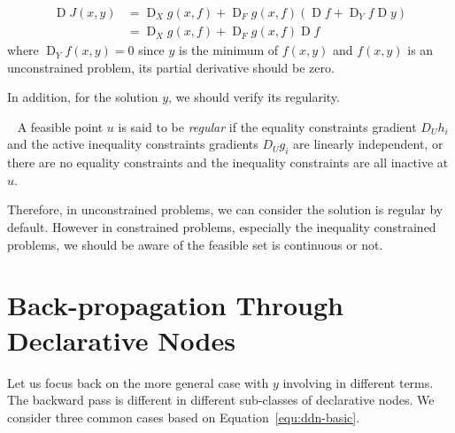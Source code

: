 \begin{equation}
    \begin{aligned} 
        \operatorname{D} J(x, y) &=\operatorname{D}_{X} g(x, f)+\operatorname{D}_{F} g(x, f)\left(\operatorname{D} f+\operatorname{D}_{Y} f \operatorname{D} y\right) \\ &=\operatorname{D}_{X} g(x, f)+\operatorname{D}_{F} g(x, f) \operatorname{D} f 
    \end{aligned}
\end{equation}
where $\operatorname{D}_Yf(x,y) = 0$ since $y$ is the minimum of $f(x,y)$ and $f(x,y)$ is an unconstrained problem, its partial derivative should be zero. 
\par In addition, for the solution $y$, we should verify its regularity. 
\begin{defn}~\citep{SG:19}
    A feasible point $u$ is said to be \emph{regular} if the equality constraints gradient $D_Uh_i$ and the active inequality constraints gradients $D_Ug_i$ are linearly independent, or there are no equality constraints and the inequality constraints are all inactive at $u$.
\end{defn}
Therefore, in unconstrained problems, we can consider the solution is regular by default. However in constrained problems, especially the inequality constrained problems, we should be aware of the feasible set is continuous or not. 

\section{Back-propagation Through Declarative Nodes}
\label{sec:bp}
Let us focus back on the more general case with $y$ involving in different terms. The backward pass is different in different sub-classes of declarative nodes. We consider three common cases based on Equation~\ref{equ:ddn-basic}. 

